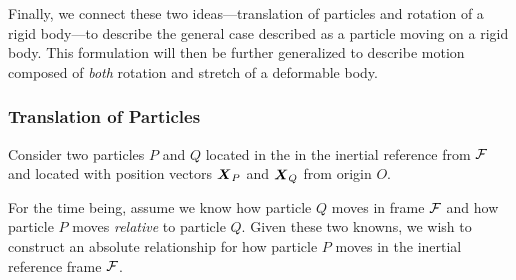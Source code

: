 Finally, we connect these two ideas---translation of particles and rotation
of a rigid body---to describe the general case described as a particle
moving on a rigid body.  This formulation will then be further generalized
to describe motion composed of {\em both} rotation and stretch of a 
deformable body.

\subsubsection{Translation of Particles}
Consider two particles $P$ and $Q$ located in the in the 
inertial reference from $\mathcal{F}$ and located with position vectors
$\mbox{\boldmath $X$}_{P}$ and $\mbox{\boldmath $X$}_{Q}$ from origin $O$.

For the time being, assume we know how particle $Q$ moves
in frame $\mathcal{F}$ and how particle $P$ moves {\em relative} to 
particle $Q$.  Given these two knowns, we wish to construct 
an absolute relationship for how particle $P$ moves in the
inertial reference frame $\mathcal{F}$.

